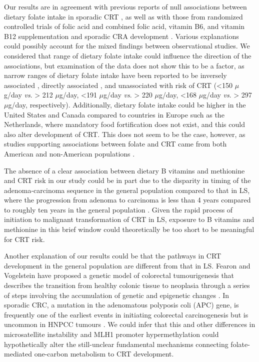 \noindent Our results are in agreement with previous reports of null associations between dietary folate intake in sporadic CRT \cite{c619,c620,c622}, as well as with those from randomized controlled trials of folic acid and combined folic acid, vitamin B6, and vitamin B12 supplementation and sporadic CRA development \cite{c640,c642}. Various explanations could possibly account for the mixed findings between observational studies. We considered that range of dietary folate intake could influence the direction of the associations, but examination of the data does not show this to be a factor, as narrow ranges of dietary folate intake have been reported to be inversely associated \cite{c643}, directly associated \cite{c621}, and unassociated \cite{c622} with risk of CRT (<150 $\mu$g/day \emph{vs}. > 212 $\mu$g/day, <191 $\mu$g/day \emph{vs}. > 220 $\mu$g/day, <168 $\mu$g/day \emph{vs}. > 297 $\mu$g/day, respectively). Additionally, dietary folate intake could be higher in the United States and Canada compared 
to countries in Europe such as the Netherlands, where mandatory food fortification does not exist, and this could also alter development of CRT. This does not seem to be the case, however, as studies supporting associations between folate and CRT came from both American \cite{c617} and non-American populations \cite{c616,c634}.

\noindent The absence of a clear association between dietary B vitamins and methionine and CRT risk in our study could be in part due to the disparity in timing of the adenoma-carcinoma sequence in the general population compared to that in LS, where the progression from adenoma to carcinoma is less than 4 years \cite{c610,c644} compared to roughly ten years in the general population \cite{c645}. Given the rapid process of initiation to malignant transformation of CRT in LS, exposure to B vitamins and methionine in this brief window could theoretically be too short to be meaningful for CRT risk.

\noindent Another explanation of our results could be that the pathways in CRT development in the general population are different from that in LS. Fearon and Vogelstein have proposed a genetic model of colorectal tumourigenesis that describes the transition from healthy colonic tissue to neoplasia through a series of steps involving the accumulation of genetic and epigenetic changes \cite{c68}. In sporadic CRC, a mutation in the adenomatous polyposis coli (APC) gene, is frequently one of the earliest events in initiating colorectal carcinogenesis \cite{c646} but is uncommon in HNPCC tumours \cite{c647}. We could infer that this and other differences in microsatellite instability and MLH1 promoter hypermethylation could hypothetically alter the still-unclear fundamental mechanisms connecting folate-mediated one-carbon metabolism to CRT development.

